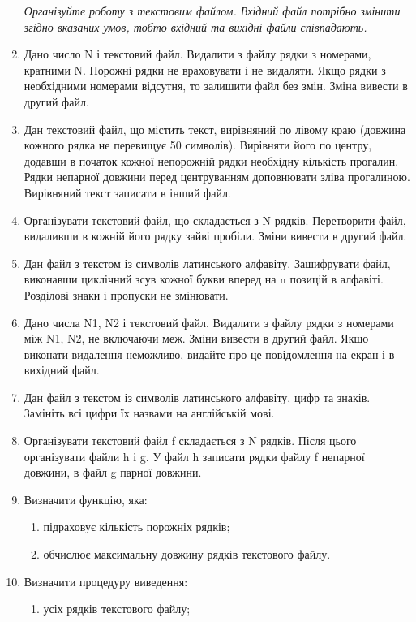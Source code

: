 \documentclass[]{article}
\makeatletter
\newcommand{\xslalph}[1]{\expandafter\@xslalph\csname c@#1\endcsname}
\newcommand{\@xslalph}[1]{%
    \ifcase#1\or а\or б\or в\or г\or д\or e\or є\or ж\or з\or i%
    \or й\or к\or л\or м\or н\or о\or п\or р\or с\or т%
    \or у\or ф\or х\or ц\or ч\or ш\or ю\or я\or аа\or бб\or вв %
    \else\@ctrerr\fi%
}
\makeatother
\begin{document}
\begin{enumerate}
\emph{Організуйте роботу з текстовим
файлом. Вхідний файл потрібно змінити згідно вказаних умов, тобто
вхідний та вихідні файли співпадають.}

\item
Дано число N і текстовий файл. Видалити з файлу рядки з номерами,
кратними N. Порожні рядки не враховувати і не видаляти. Якщо рядки з
необхідними номерами відсутня, то залишити файл без змін. Зміна вивести
в другий файл.
\item
Дан текстовий файл, що містить текст, вирівняний по лівому краю (довжина
кожного рядка не перевищує 50 символів). Вирівняти його по центру,
додавши в початок кожної непорожній рядки необхідну кількість прогалин.
Рядки непарної довжини перед центруванням доповнювати зліва прогалиною.
Вирівняний текст записати в інший файл.
\item
Організувати текстовий файл, що складається з N рядків. Перетворити
файл, видаливши в кожній його рядку зайві пробіли. Зміни вивести в
другий файл.
\item
Дан файл з текстом із символів латинського алфавіту. Зашифрувати файл,
виконавши циклічний зсув кожної букви вперед на n позицій в алфавіті.
Розділові знаки і пропуски не змінювати.
\item
Дано числа N1, N2 і текстовий файл. Видалити з файлу рядки з номерами
між N1, N2, не включаючи меж. Зміни вивести в другий файл. Якщо виконати
видалення неможливо, видайте про це повідомлення на екран і в вихідний
файл.
\item
Дан файл з текстом із символів латинського алфавіту, цифр та знаків.
Замініть всі цифри їх назвами на англійській мові.
\item
Організувати текстовий файл f складається з N рядків. Після цього
організувати файли h і g. У файл h записати рядки файлу f непарної
довжини, в файл g парної довжини.
\item
Визначити функцію, яка:
\begin{enumerate}[label=\xslalph*)]
\item підраховує кількість порожніх рядків;

\item обчислює максимальну довжину рядків текстового файлу.
\end{enumerate}

\item
Визначити процедуру виведення:
\begin{enumerate}[label=\xslalph*)]
\item усіх рядків текстового файлу;


\end{enumerate}
\end{enumerate}
\end{document}

